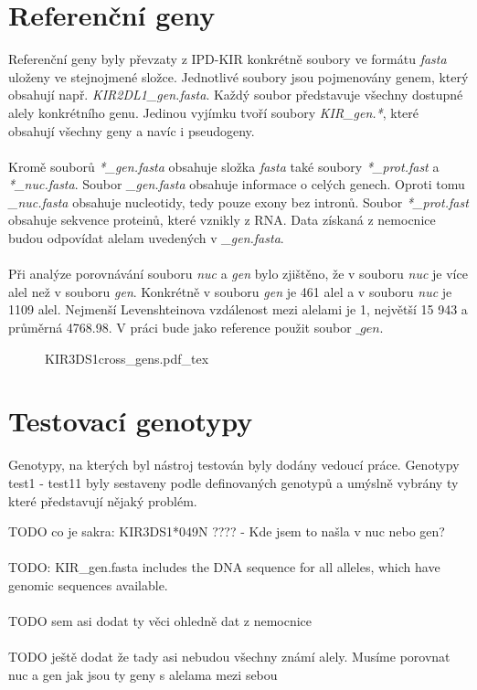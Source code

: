 \documentclass[czech,DP]{thesiskiv}
\numberwithin{equation}{section}
\begin{document}
\section{Referenční geny}
Referenční geny byly převzaty z IPD-KIR \cite{imgt_hla_database} konkrétně soubory ve formátu \textit{fasta} uloženy ve stejnojmené složce. Jednotlivé soubory jsou pojmenovány genem, který obsahují např. \textit{KIR2DL1\_gen.fasta}. Každý soubor představuje všechny dostupné alely konkrétního genu. Jedinou vyjímku tvoří soubory \textit{KIR\_gen.*}, které obsahují všechny geny a navíc i pseudogeny. 
\\
\\
Kromě souborů \textit{*\_gen.fasta} obsahuje složka \textit{fasta} také soubory \textit{*\_prot.fast} a \textit{*\_nuc.fasta}. Soubor \textit{\_gen.fasta} obsahuje informace o celých genech. Oproti tomu \textit{\_nuc.fasta} obsahuje nucleotidy, tedy pouze exony bez intronů. Soubor \textit{*\_prot.fast} obsahuje sekvence proteinů, které vznikly z RNA. Data získaná z nemocnice budou odpovídat alelam uvedených v \textit{\_gen.fasta}. 
\\
\\
Při analýze porovnávání souboru \textit{nuc} a \textit{gen} bylo zjištěno, že v souboru \textit{nuc} je více alel než v souboru \textit{gen}. Konkrétně v souboru \textit{gen} je 461 alel a v souboru \textit{nuc} je 1109 alel. Nejmenší Levenshteinova vzdálenost mezi alelami je 1, největší 15 943 a průměrná 4768.98. V práci bude jako reference použit soubor $\_gen$.

\begin{figure}[H]
    \centering
    \def\svgwidth{\columnwidth}
    {KIR3DS1cross_gens.pdf_tex} 
\end{figure}

\section{Testovací genotypy}
Genotypy, na kterých byl nástroj testován byly dodány vedoucí práce. Genotypy test1 - test11 byly sestaveny podle definovaných genotypů a umýslně vybrány ty které představují nějaký problém.


TODO co je sakra:  KIR3DS1*049N ???? - Kde jsem to našla v nuc nebo gen?
\\
\\
TODO: KIR\_gen.fasta  includes the DNA sequence for all alleles, which have genomic sequences available.
\\
\\
TODO sem asi dodat ty věci ohledně dat z nemocnice
\\
\\
TODO ještě dodat že tady asi nebudou všechny známí alely.
Musíme porovnat nuc a gen jak jsou ty geny s alelama mezi sebou
\end{document}
